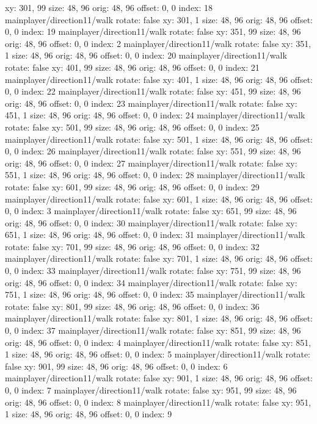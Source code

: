   xy: 301, 99
  size: 48, 96
  orig: 48, 96
  offset: 0, 0
  index: 18
mainplayer/direction11/walk
  rotate: false
  xy: 301, 1
  size: 48, 96
  orig: 48, 96
  offset: 0, 0
  index: 19
mainplayer/direction11/walk
  rotate: false
  xy: 351, 99
  size: 48, 96
  orig: 48, 96
  offset: 0, 0
  index: 2
mainplayer/direction11/walk
  rotate: false
  xy: 351, 1
  size: 48, 96
  orig: 48, 96
  offset: 0, 0
  index: 20
mainplayer/direction11/walk
  rotate: false
  xy: 401, 99
  size: 48, 96
  orig: 48, 96
  offset: 0, 0
  index: 21
mainplayer/direction11/walk
  rotate: false
  xy: 401, 1
  size: 48, 96
  orig: 48, 96
  offset: 0, 0
  index: 22
mainplayer/direction11/walk
  rotate: false
  xy: 451, 99
  size: 48, 96
  orig: 48, 96
  offset: 0, 0
  index: 23
mainplayer/direction11/walk
  rotate: false
  xy: 451, 1
  size: 48, 96
  orig: 48, 96
  offset: 0, 0
  index: 24
mainplayer/direction11/walk
  rotate: false
  xy: 501, 99
  size: 48, 96
  orig: 48, 96
  offset: 0, 0
  index: 25
mainplayer/direction11/walk
  rotate: false
  xy: 501, 1
  size: 48, 96
  orig: 48, 96
  offset: 0, 0
  index: 26
mainplayer/direction11/walk
  rotate: false
  xy: 551, 99
  size: 48, 96
  orig: 48, 96
  offset: 0, 0
  index: 27
mainplayer/direction11/walk
  rotate: false
  xy: 551, 1
  size: 48, 96
  orig: 48, 96
  offset: 0, 0
  index: 28
mainplayer/direction11/walk
  rotate: false
  xy: 601, 99
  size: 48, 96
  orig: 48, 96
  offset: 0, 0
  index: 29
mainplayer/direction11/walk
  rotate: false
  xy: 601, 1
  size: 48, 96
  orig: 48, 96
  offset: 0, 0
  index: 3
mainplayer/direction11/walk
  rotate: false
  xy: 651, 99
  size: 48, 96
  orig: 48, 96
  offset: 0, 0
  index: 30
mainplayer/direction11/walk
  rotate: false
  xy: 651, 1
  size: 48, 96
  orig: 48, 96
  offset: 0, 0
  index: 31
mainplayer/direction11/walk
  rotate: false
  xy: 701, 99
  size: 48, 96
  orig: 48, 96
  offset: 0, 0
  index: 32
mainplayer/direction11/walk
  rotate: false
  xy: 701, 1
  size: 48, 96
  orig: 48, 96
  offset: 0, 0
  index: 33
mainplayer/direction11/walk
  rotate: false
  xy: 751, 99
  size: 48, 96
  orig: 48, 96
  offset: 0, 0
  index: 34
mainplayer/direction11/walk
  rotate: false
  xy: 751, 1
  size: 48, 96
  orig: 48, 96
  offset: 0, 0
  index: 35
mainplayer/direction11/walk
  rotate: false
  xy: 801, 99
  size: 48, 96
  orig: 48, 96
  offset: 0, 0
  index: 36
mainplayer/direction11/walk
  rotate: false
  xy: 801, 1
  size: 48, 96
  orig: 48, 96
  offset: 0, 0
  index: 37
mainplayer/direction11/walk
  rotate: false
  xy: 851, 99
  size: 48, 96
  orig: 48, 96
  offset: 0, 0
  index: 4
mainplayer/direction11/walk
  rotate: false
  xy: 851, 1
  size: 48, 96
  orig: 48, 96
  offset: 0, 0
  index: 5
mainplayer/direction11/walk
  rotate: false
  xy: 901, 99
  size: 48, 96
  orig: 48, 96
  offset: 0, 0
  index: 6
mainplayer/direction11/walk
  rotate: false
  xy: 901, 1
  size: 48, 96
  orig: 48, 96
  offset: 0, 0
  index: 7
mainplayer/direction11/walk
  rotate: false
  xy: 951, 99
  size: 48, 96
  orig: 48, 96
  offset: 0, 0
  index: 8
mainplayer/direction11/walk
  rotate: false
  xy: 951, 1
  size: 48, 96
  orig: 48, 96
  offset: 0, 0
  index: 9

